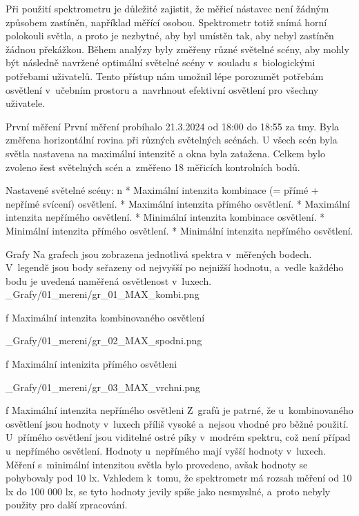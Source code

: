 Při použití spektrometru je důležité zajistit, že měřicí nástavec není žádným způsobem zastíněn,
například měřící osobou. Spektrometr totiž snímá horní polokouli světla, a proto je nezbytné, aby byl umístěn tak, aby nebyl zastíněn žádnou překážkou.
\medskip
Během analýzy byly změřeny různé světelné scény, aby mohly být následně navržené optimální světelné scény
v~souladu s~biologickými potřebami uživatelů. Tento přístup nám umožnil lépe porozumět potřebám osvětlení
v~učebním prostoru a~navrhnout efektivní osvětlení pro všechny uživatele.

\sec První měření
První měření probíhalo 21.3.2024 od 18:00 do 18:55 za tmy. Byla změřena horizontální rovina při různých
světelných scénách. U všech scén byla světla nastavena na maximální intenzitě a okna byla zatažena. Celkem bylo zvoleno šest světelných scén a~změřeno 18 měřicích kontrolních bodů.
\medskip

{\sbf Nastavené světelné scény:}
\medskip
\begitems \style n
    * Maximální intenzita kombinace (= přímé + nepřímé svícení) osvětlení.
    * Maximální intenzita přímého osvětlení.
    * Maximální intenzita nepřímého osvětlení.
    * Minimální intenzita kombinace osvětlení.
    * Minimální intenzita přímého osvětlení.
    * Minimální intenzita nepřímého osvětlení.
\enditems

\secc Grafy
Na grafech jsou zobrazena jednotlivá spektra v~měřených bodech. V~legendě jsou body seřazeny od nejvyšší
po nejnižší hodnotu, a~vedle každého bodu je uvedená naměřená osvětlenost v~luxech.
\medskip {}
\picw=15cm _Grafy/01_mereni/gr_01_MAX_kombi.png
\caption/f Maximální intenzita kombinovaného osvětlení

\medskip {}
\picw=15cm _Grafy/01_mereni/gr_02_MAX_spodni.png
\caption/f Maximální intenizita přímého osvětleni

\medskip {}
\picw=15cm _Grafy/01_mereni/gr_03_MAX_vrchni.png
\caption/f Maximální intenzita nepřímého osvětleni
\medskip
Z~grafů je patrné, že u~kombinovaného osvětlení jsou hodnoty v~luxech příliš vysoké a~nejsou vhodné pro běžné použití.
U~přímého osvětlení jsou viditelné ostré píky v~modrém spektru, což není případ u~nepřímého osvětlení.
Hodnoty u~nepřímého mají vyšší hodnoty v~luxech.
\medskip
Měření s~minimální intenzitou světla bylo provedeno, avšak hodnoty se pohybovaly pod 10 lx. Vzhledem k~tomu,
že spektrometr má rozsah měření od 10 lx do 100 000 lx, se tyto hodnoty jevily spíše jako nesmyslné, a~proto
nebyly použity pro další zpracování.


